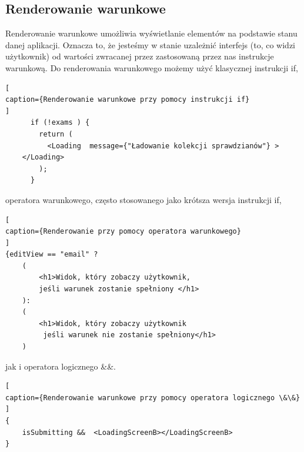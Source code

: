 \documentclass[oneside,polski,logo,indent]{amuthesis}
\begin{document}
\subsection{Renderowanie warunkowe}
Renderowanie warunkowe umożliwia wyświetlanie elementów na podstawie stanu danej aplikacji. Oznacza to, że jesteśmy w stanie uzależnić interfejs (to, co widzi użytkownik) od wartości zwracanej przez zastosowaną przez nas instrukcje warunkową.
Do renderowania warunkowego możemy użyć klasycznej instrukcji if,
\begin{lstlisting}[
caption={Renderowanie warunkowe przy pomocy instrukcji if}
]
      if (!exams ) {
        return (
          <Loading  message={"Ładowanie kolekcji sprawdzianów"} >
	</Loading>
        );
      }
\end{lstlisting}
operatora warunkowego, często stosowanego jako krótsza wersja instrukcji if,
\begin{lstlisting}[
caption={Renderowanie przy pomocy operatora warunkowego}
]
{editView == "email" ?
	(
		<h1>Widok, który zobaczy użytkownik,
		jeśli warunek zostanie spełniony </h1>
	):
	(
		<h1>Widok, który zobaczy użytkownik
		 jeśli warunek nie zostanie spełniony</h1>
	)
\end{lstlisting}
jak i operatora logicznego \&\&.
\begin{lstlisting}[
caption={Renderowanie warunkowe przy pomocy operatora logicznego \&\&}
]
{
	isSubmitting &&  <LoadingScreenB></LoadingScreenB>
}  
\end{lstlisting}
\end{document}
